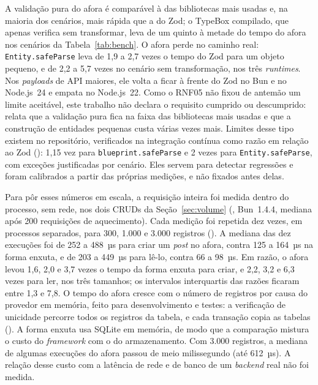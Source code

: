 \documentclass[a4paper,12pt]{article}
\newcommand{\estr}[1]{\textit{#1}}
\begin{document}
A validação pura do afora é comparável à das bibliotecas mais usadas e, na maioria dos cenários, mais rápida que a do Zod; o TypeBox compilado, que apenas verifica sem transformar, leva de um quinto à metade do tempo do afora nos cenários da Tabela~\ref{tab:bench}. O afora perde no caminho real: \texttt{Entity.safeParse} leva de 1,9 a 2,7 vezes o tempo do Zod para um objeto pequeno, e de 2,2 a 5,7 vezes no cenário sem transformação, nos três \estr{runtimes}. Nos \estr{payloads} de API maiores, ele volta a ficar à frente do Zod no Bun e no Node.js~24 e empata no Node.js~22. Como o RNF05 não fixou de antemão um limite aceitável, este trabalho não declara o requisito cumprido ou descumprido: relata que a validação pura fica na faixa das bibliotecas mais usadas e que a construção de entidades pequenas custa várias vezes mais. Limites desse tipo existem no repositório, verificados na integração contínua como razão em relação ao Zod (): 1,15 vez para \texttt{blueprint.safeParse} e 2 vezes para \texttt{Entity.safeParse}, com exceções justificadas por cenário. Eles servem para detectar regressões e foram calibrados a partir das próprias medições, e não fixados antes delas.

Para pôr esses números em escala, a requisição inteira foi medida dentro do processo, sem rede, nos dois CRUDs da Seção~\ref{sec:volume} (, Bun~1.4.4, mediana após 200 requisições de aquecimento). Cada medição foi repetida dez vezes, em processos separados, para 300, 1.000 e 3.000 registros (). A mediana das dez execuções foi de 252 a 488~µs para criar um \estr{post} no afora, contra 125 a 164~µs na forma enxuta, e de 203 a 449~µs para lê-lo, contra 66 a 98~µs. Em razão, o afora levou 1,6, 2,0 e 3,7 vezes o tempo da forma enxuta para criar, e 2,2, 3,2 e 6,3 vezes para ler, nos três tamanhos; os intervalos interquartis das razões ficaram entre 1,3 e 7,8. O tempo do afora cresce com o número de registros por causa do provedor em memória, feito para desenvolvimento e testes: a verificação de unicidade percorre todos os registros da tabela, e cada transação copia as tabelas (). A forma enxuta usa SQLite em memória, de modo que a comparação mistura o custo do \estr{framework} com o do armazenamento. Com 3.000 registros, a mediana de algumas execuções do afora passou de meio milissegundo (até 612~µs). A relação desse custo com a latência de rede e de banco de um \estr{backend} real não foi medida.
\end{document}
